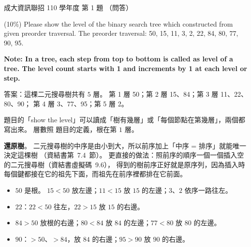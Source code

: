 \begin{pastexam}[label={px:ncku-110-prog-01}]{成大資訊聯招 110 學年度 第 1 題}
（問答）

(10\%) Please show the level of the binary search tree which constructed from given preorder
traversal. The preorder traversal: 50, 15, 11, 3, 2, 22, 84, 80, 77, 90, 95.

\textbf{Note: In a tree, each step from top to bottom is called as level of a tree. The level
count starts with 1 and increments by 1 at each level or step.}
\end{pastexam}

\begin{pastsoln}
答案：這棵二元搜尋樹共有 $5$ 層。 第 1 層 50；第 2 層 15、84；第 3 層 11、22、80、90；
第 4 層 3、77、95；第 5 層 2。

題目的「show the level」可以讀成「樹有幾層」或「每個節點在第幾層」，兩個都寫出來。 層數照
題目的定義，根在第 $1$ 層。

\textbf{還原樹}。 二元搜尋樹的中序是由小到大，所以前序加上「中序 = 排序」就能唯一決定這棵樹
（資結書第~7.4~節）。 更直接的做法：照前序的順序一個一個插入空的二元搜尋樹（資結書虛擬碼~9.6），
得到的樹前序正好就是原序列，因為插入時每個鍵都接在它的祖先下面，而祖先在前序裡都排在它前面。
\begin{itemize}
\item $50$ 是根。 $15 < 50$ 放左邊；$11 < 15$ 放 $15$ 的左邊；$3$、$2$ 依序一路往左。
\item $22$：$22 < 50$ 往左，$22 > 15$ 放 $15$ 的右邊。
\item $84 > 50$ 放根的右邊；$80 < 84$ 放 $84$ 的左邊；$77 < 80$ 放 $80$ 的左邊。
\item $90$：$> 50$、$> 84$，放 $84$ 的右邊；$95 > 90$ 放 $90$ 的右邊。
\end{itemize}

\begin{center}
\end{center}


\end{pastsoln}

